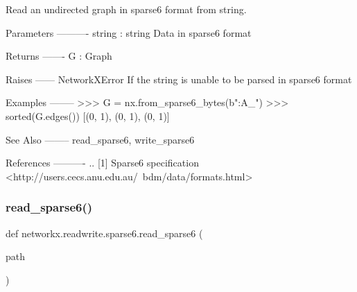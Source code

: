 \begin{DoxyVerb}Read an undirected graph in sparse6 format from string.

Parameters
----------
string : string
   Data in sparse6 format

Returns
-------
G : Graph

Raises
------
NetworkXError
    If the string is unable to be parsed in sparse6 format

Examples
--------
>>> G = nx.from_sparse6_bytes(b":A_")
>>> sorted(G.edges())
[(0, 1), (0, 1), (0, 1)]

See Also
--------
read_sparse6, write_sparse6

References
----------
.. [1] Sparse6 specification
       <http://users.cecs.anu.edu.au/~bdm/data/formats.html>\end{DoxyVerb}
 \mbox{\label{namespacenetworkx_1_1readwrite_1_1sparse6_a55594fbb44cb9b1479a0a10869e18f80}} 
\subsubsection{\texorpdfstring{read\+\_\+sparse6()}{read\_sparse6()}}
{\footnotesize\ttfamily def networkx.\+readwrite.\+sparse6.\+read\+\_\+sparse6 (\begin{DoxyParamCaption}\item[{}]{path }\end{DoxyParamCaption})}

